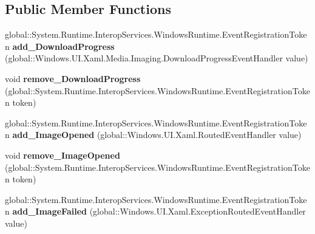 \subsection*{Public Member Functions}
\begin{DoxyCompactItemize}
\item 
\mbox{\label{class_windows_1_1_u_i_1_1_xaml_1_1_media_1_1_imaging_1_1_bitmap_image_ad8b669920d50527747f0632426807fbf}} 
global\+::\+System.\+Runtime.\+Interop\+Services.\+Windows\+Runtime.\+Event\+Registration\+Token {\bfseries add\+\_\+\+Download\+Progress} (global\+::\+Windows.\+U\+I.\+Xaml.\+Media.\+Imaging.\+Download\+Progress\+Event\+Handler value)
\item 
\mbox{\label{class_windows_1_1_u_i_1_1_xaml_1_1_media_1_1_imaging_1_1_bitmap_image_a2eb34dc2eba36825836cc7578bc62ad3}} 
void {\bfseries remove\+\_\+\+Download\+Progress} (global\+::\+System.\+Runtime.\+Interop\+Services.\+Windows\+Runtime.\+Event\+Registration\+Token token)
\item 
\mbox{\label{class_windows_1_1_u_i_1_1_xaml_1_1_media_1_1_imaging_1_1_bitmap_image_a009137ccb3242294d0b233b43447b15e}} 
global\+::\+System.\+Runtime.\+Interop\+Services.\+Windows\+Runtime.\+Event\+Registration\+Token {\bfseries add\+\_\+\+Image\+Opened} (global\+::\+Windows.\+U\+I.\+Xaml.\+Routed\+Event\+Handler value)
\item 
\mbox{\label{class_windows_1_1_u_i_1_1_xaml_1_1_media_1_1_imaging_1_1_bitmap_image_abd3f6dad75c8f3bd98204092748f8218}} 
void {\bfseries remove\+\_\+\+Image\+Opened} (global\+::\+System.\+Runtime.\+Interop\+Services.\+Windows\+Runtime.\+Event\+Registration\+Token token)
\item 
\mbox{\label{class_windows_1_1_u_i_1_1_xaml_1_1_media_1_1_imaging_1_1_bitmap_image_ada8ed4999b6cb99d62a42b9ebf4c4313}} 
global\+::\+System.\+Runtime.\+Interop\+Services.\+Windows\+Runtime.\+Event\+Registration\+Token {\bfseries add\+\_\+\+Image\+Failed} (global\+::\+Windows.\+U\+I.\+Xaml.\+Exception\+Routed\+Event\+Handler value)

\end{DoxyCompactItemize}
